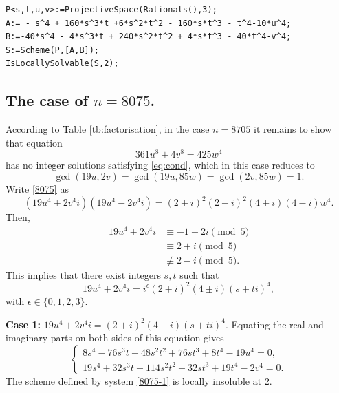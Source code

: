 \documentclass[a4paper,12pt,english,reqno]{amsart}
\begin{document}
\begin{lstlisting}
P<s,t,u,v>:=ProjectiveSpace(Rationals(),3);
A:= - s^4 + 160*s^3*t +6*s^2*t^2 - 160*s*t^3 - t^4-10*u^4;
B:=-40*s^4 - 4*s^3*t + 240*s^2*t^2 + 4*s*t^3 - 40*t^4-v^4;
S:=Scheme(P,[A,B]);
IsLocallySolvable(S,2);
\end{lstlisting}



\subsection{The case of $n=8075$.}%
 According to Table \ref{tb:factorisation}, in the case $n=8705$ it remains to
show that equation
\begin{equation}\label{8075}
361 u^8 + 4 v^8=425  w^4
\end{equation}
has no integer solutions satisfying \eqref{eq:cond}, which in this case reduces to \[\gcd(19u,2v)=\gcd(19u,85w)=\gcd(2v,85w)=1.\]
Write \eqref{8075} as 
\begin{equation} (19u^4+2v^4i)(19u^4-2v^4i)=(2+i)^2(2-i)^2(4+i)(4-i)w^4.
\end{equation}
Then, 
\[\begin{split}
    19u^4+2v^4i&\equiv -1+2i\pmod{5}\\
    &\equiv 2+i\pmod{5}\\
    &\not\equiv 2-i\pmod{5}.
\end{split}\]
This implies that there exist integers $s,t$ such that 
\[19u^4+2v^4i=i^{\epsilon}(2+i)^2(4\pm i)(s+ti)^4,\]
with $\epsilon \in \{0,1,2,3\}$.


{\bf Case 1:} $19u^4+2v^4i=(2+i)^2(4+i)(s+ti)^4$. Equating the real and imaginary parts on both sides of this equation gives
\begin{equation}\label{8075-1}
\begin{cases}
8s^4 - 76s^3t - 48s^2t^2 + 76st^3 + 8t^4 - 19u^4=0,\\
19s^4 + 32s^3t - 114s^2t^2 - 32st^3 + 19t^4 - 2v^4=0.
\end{cases}
\end{equation}
The scheme defined by system \eqref{8075-1} is locally insoluble at $2$.
\end{document}
